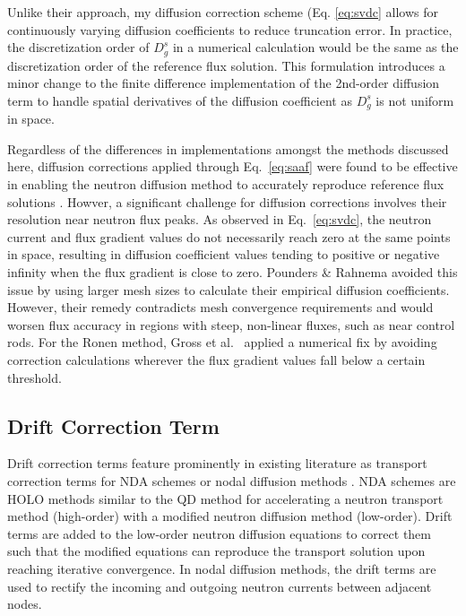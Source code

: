 Unlike their approach, my diffusion correction scheme (Eq. \ref{eq:svdc} allows for continuously
varying diffusion coefficients to reduce truncation error. In practice, the discretization order of
$D^s_g$ in a numerical calculation would be the same as the discretization order of
the reference flux solution. This formulation introduces a minor change to the finite difference
implementation of the 2nd-order diffusion term to handle spatial derivatives of the
diffusion coefficient as $D^s_g$ is not uniform in space.

Regardless of the differences in implementations amongst the methods discussed here,
diffusion corrections applied through Eq.\ \ref{eq:saaf} were
found to be effective in enabling the neutron diffusion method to accurately reproduce reference
flux solutions \cite{gross_comprehensive_2023, pounders_diffusion_2009}.
Howver, a significant challenge for diffusion corrections
involves their resolution near neutron flux peaks. As observed in Eq.\ \ref{eq:svdc}, the neutron
current and flux gradient values do not necessarily reach zero at the same points in space,
resulting in diffusion coefficient values tending to positive or negative infinity when the
flux gradient is close to zero. Pounders \& Rahnema avoided this issue by using
larger mesh sizes to calculate their empirical diffusion coefficients. However, their
remedy contradicts mesh convergence requirements and would worsen flux accuracy in regions with
steep, non-linear fluxes, such as near control rods. For the Ronen method, Gross et al.\
\cite{gross_comprehensive_2023} applied a numerical fix by avoiding correction
calculations wherever the flux gradient values fall below a certain threshold. 

\subsection{Drift Correction Term} \label{sec:drift-correction}

Drift correction terms feature prominently in existing literature as transport correction
terms for \gls{NDA} schemes or nodal diffusion methods
\cite{smith_nodal_1983, smith_assembly_1986, adams_fast_2002, wang_diffusion_2014}. \gls{NDA}
schemes are \gls{HOLO} methods \cite{chacon_multiscale_2017} similar to the \gls{QD} method for
accelerating a neutron transport
method (high-order) with a modified neutron diffusion method (low-order). Drift terms
are added to the low-order neutron diffusion equations to correct them such that the modified
equations can reproduce the transport solution upon reaching iterative convergence. In nodal
diffusion methods, the drift terms are used to rectify the incoming and outgoing neutron
currents between adjacent nodes.

